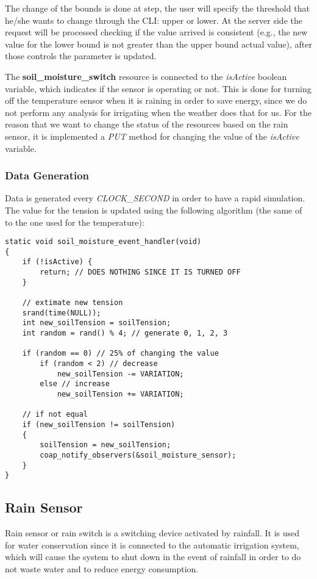 The change of the bounds is done at step, the user will specify the threshold that he/she wants to change through the CLI: upper or lower. At the server side the request will be processed checking if the value arrived is consistent (e.g., the new value for the lower bound is not greater than the upper bound actual value), after those controls the parameter is updated.

The \textbf{soil\_moisture\_switch} resource is connected to the \textit{isActive} boolean variable, which indicates if the sensor is operating or not. This is done for turning off the temperature sensor when it is raining in order to save energy, since we do not perform any analysis for irrigating when the weather does that for us. For the reason that we want to change the status of the resources based on the rain sensor, it is implemented a \textit{PUT} method for changing the value of the \textit{isActive} variable.

\subsubsection{Data Generation}
Data is generated every \textit{CLOCK\_SECOND} in order to have a rapid simulation. The value for the tension is updated using the following algorithm (the same of to the one used for the temperature):

\begin{lstlisting}
static void soil_moisture_event_handler(void)
{
    if (!isActive) {
        return; // DOES NOTHING SINCE IT IS TURNED OFF
    }
    
    // extimate new tension
    srand(time(NULL));
    int new_soilTension = soilTension;
    int random = rand() % 4; // generate 0, 1, 2, 3
    
    if (random == 0) // 25% of changing the value
        if (random < 2) // decrease
            new_soilTension -= VARIATION;
        else // increase
            new_soilTension += VARIATION;

    // if not equal
    if (new_soilTension != soilTension)
    {
        soilTension = new_soilTension;
        coap_notify_observers(&soil_moisture_sensor);
    }
}
\end{lstlisting}



\subsection{Rain Sensor}
Rain sensor or rain switch is a switching device activated by rainfall. It is used for water conservation since it is connected to the automatic irrigation system, which will cause the system to shut down in the event of rainfall in order to do not waste water and to reduce energy consumption.

